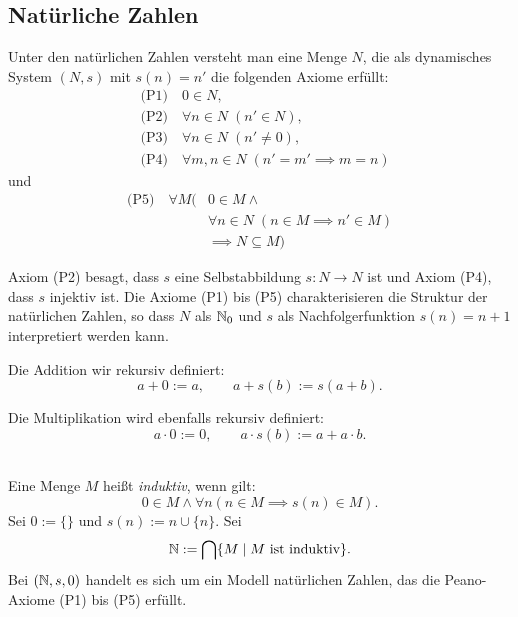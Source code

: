 \subsection{Natürliche Zahlen}
\begin{definition}
Unter den natürlichen Zahlen versteht man eine Menge $N$, die
als dynamisches System $(N,s)$ mit $s(n)=n'$ die folgenden Axiome erfüllt:
\begin{align}
& \text{(P1)}\quad 0\in N,\\
& \text{(P2)}\quad \forall n{\in}N\;(n'\in N),\\
& \text{(P3)}\quad \forall n{\in}N\;(n'\ne 0),\\
& \text{(P4)}\quad \forall m,n{\in}N\;(n'=m'\implies m=n)
\end{align}
und
\begin{equation}
\begin{split}
\text{(P5)}\quad \forall M(&0\in M\land\\
& \forall n{\in}N\;(n\in M\implies n'\in M)\\
& \implies N\subseteq M)
\end{split}
\end{equation}
\end{definition}
Axiom (P2) besagt, dass $s$ eine Selbstabbildung $s\colon N\to N$
ist und Axiom (P4), dass $s$ injektiv ist. Die Axiome (P1) bis (P5)
charakterisieren die Struktur der natürlichen Zahlen, so dass
$N$ als $\mathbb N_0$ und $s$ als Nachfolgerfunktion $s(n)=n+1$ interpretiert
werden kann.

Die Addition wir rekursiv definiert:
\begin{equation}
a+0 := a,\qquad a+s(b) := s(a+b).
\end{equation}

Die Multiplikation wird ebenfalls rekursiv definiert:
\begin{equation}
a\cdot 0 := 0,\qquad a\cdot s(b):=a+a\cdot b.
\end{equation}

\noindent
{}\\
Eine Menge $M$ heißt \emph{induktiv}, wenn gilt:
\begin{equation}
0\in M\land \forall n(n\in M\implies s(n)\in M).
\end{equation}
Sei $0:=\{\}$ und $s(n):=n\cup\{n\}$. Sei
\begin{equation}
\mathbb N := \bigcap \{M\mid M\text{ ist induktiv}\}.
\end{equation}
Bei $(\mathbb N,s,0)$ handelt es sich um ein Modell
natürlichen Zahlen, das die Peano-Axiome (P1) bis (P5) erfüllt.

